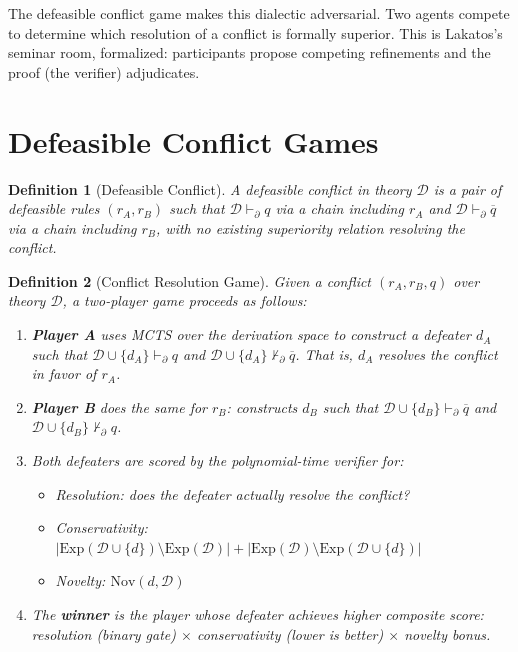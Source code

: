 \documentclass[11pt]{article}
\newtheorem{definition}{Definition}
\newcommand{\D}{\mathcal{D}}
\newcommand{\Exp}{\mathrm{Exp}}
\newcommand{\Nov}{\mathrm{Nov}}
\newcommand{\pPartial}{\vdash_{\partial}}
\newcommand{\comp}[1]{\overline{#1}}
\begin{document}
The defeasible conflict game makes this dialectic adversarial. Two agents compete to determine which resolution of a conflict is formally superior. This is Lakatos's seminar room, formalized: participants propose competing refinements and the proof (the verifier) adjudicates.

\section{Defeasible Conflict Games}

\begin{definition}[Defeasible Conflict]
A defeasible conflict in theory $\D$ is a pair of defeasible rules $(r_A, r_B)$ such that $\D \pPartial q$ via a chain including $r_A$ and $\D \pPartial \comp{q}$ via a chain including $r_B$, with no existing superiority relation resolving the conflict.
\end{definition}

\begin{definition}[Conflict Resolution Game]
Given a conflict $(r_A, r_B, q)$ over theory $\D$, a two-player game proceeds as follows:
\begin{enumerate}[nosep]
    \item \textbf{Player A} uses MCTS over the derivation space to construct a defeater $d_A$ such that $\D \cup \{d_A\} \pPartial q$ and $\D \cup \{d_A\} \not\pPartial \comp{q}$. That is, $d_A$ resolves the conflict in favor of $r_A$.
    \item \textbf{Player B} does the same for $r_B$: constructs $d_B$ such that $\D \cup \{d_B\} \pPartial \comp{q}$ and $\D \cup \{d_B\} \not\pPartial q$.
    \item Both defeaters are scored by the polynomial-time verifier for:
    \begin{itemize}[nosep]
        \item Resolution: does the defeater actually resolve the conflict?
        \item Conservativity: $|\Exp(\D \cup \{d\}) \setminus \Exp(\D)| + |\Exp(\D) \setminus \Exp(\D \cup \{d\})|$
        \item Novelty: $\Nov(d, \D)$
    \end{itemize}
    \item The \textbf{winner} is the player whose defeater achieves higher composite score: resolution (binary gate) $\times$ conservativity (lower is better) $\times$ novelty bonus.
\end{enumerate}
\end{definition}
\end{document}
